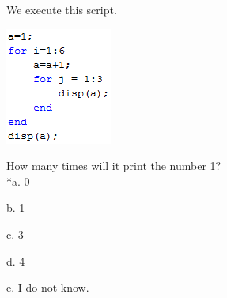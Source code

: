 
We execute this script.

\includegraphics[width=1.37519in,height=1.51063in]{../../Images/ProgrammingStructuresQ3.png}

How many times will it print the number 1? \\

*a. 0

b. 1

c. 3

d. 4

e. I do not know. \\
